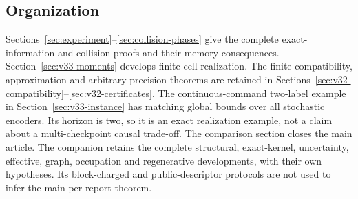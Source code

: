 \subsection{Organization}
Sections~\ref{sec:experiment}--\ref{sec:collision-phases} give the
complete exact-information and collision proofs and their memory
consequences. Section~\ref{sec:v33-moments} develops finite-cell
realization. The finite compatibility, approximation and arbitrary
precision theorems are retained in
Sections~\ref{sec:v32-compatibility}--\ref{sec:v32-certificates}.
The continuous-command two-label example in
Section~\ref{sec:v33-instance} has matching global bounds over all
stochastic encoders. Its horizon is two, so it is an exact realization
example, not a claim about a multi-checkpoint causal trade-off.
The comparison section closes the main article. The companion retains
the complete structural, exact-kernel, uncertainty, effective, graph,
occupation and regenerative developments, with their own hypotheses.
Its block-charged and public-descriptor protocols are not used to infer
the main per-report theorem.
